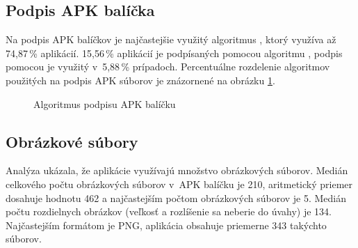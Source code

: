\subsection{Podpis APK balíčka}
Na podpis APK balíčkov je najčastejšie využitý algoritmus , ktorý využíva až 74,87\,\% aplikácií. 15,56\,\% aplikácií je podpísaných pomocou algoritmu , podpis pomocou  je využitý v~5,88\,\% prípadoch. Percentuálne rozdelenie algoritmov použitých na podpis APK súborov je znázornené na obrázku \ref{fig:signAlg}.

\begin{figure}[H]
\centering
\begin{bchart}[min=0,max=80,step=10,unit=\%]
\bcskip{6pt}
\bcskip{6pt}
\bcskip{6pt}
\bcskip{6pt}
\bcskip{6pt}
\bcskip{3pt}
\end{bchart}

\caption{Algoritmus podpisu APK balíčku}
\label{fig:signAlg}
\end{figure}

\subsection{Obrázkové súbory}
Analýza ukázala, že aplikácie využívajú množstvo obrázkových súborov. Medián celkového počtu obrázkových súborov v~APK balíčku je 210, aritmetický priemer dosahuje hodnotu 462 a najčastejším počtom obrázkových súborov je 5. Medián počtu rozdielnych obrázkov (veľkosť a rozlíšenie sa neberie do úvahy) je 134. Najčastejším formátom je PNG, aplikácia obsahuje priemerne 343 takýchto súborov.

